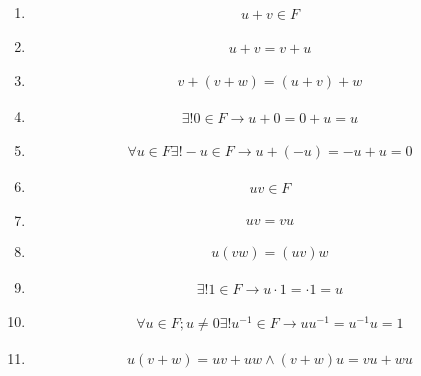 \begin{enumerate}
	\item \begin{align*}u+v \in F\end{align*}
	\item \begin{align*}u+v = v+u\end{align*}
	\item \begin{align*}v + (v + w) = (u + v) + w\end{align*}
	\item \begin{align*}\exists! 0 \in F \to u + 0 = 0 + u = u\end{align*}
	\item \begin{align*}\forall u \in F \exists! -u \in F \to  u + (-u) = -u + u = 0 \end{align*}
	\item \begin{align*}uv \in F\end{align*}
	\item \begin{align*}uv = vu\end{align*}
	\item \begin{align*}u(vw) = (uv)w\end{align*}
	\item \begin{align*}\exists! 1\in F \to u\cdot 1 = \cdot 1 = u\end{align*}
	\item \begin{align*}\forall u \in F; u \neq 0 \exists! u^{-1}\in F \to uu^{-1} = u^{-1}u = 1\end{align*}
	\item \begin{align*}u(v+w)=uv+uw \land (v+w)u = vu + wu \end{align*}
	
\end{enumerate}
%

